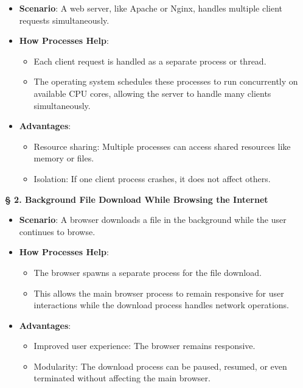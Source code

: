 \documentclass[a4paper]{book}
\newcommand{\sfbf}[1]{{\normalsize\textsf{\textbf{§ #1}}}}
\begin{document}
\begin{itemize}
\item 
\textbf{Scenario}: A web server, like Apache or Nginx, handles multiple client requests simultaneously.

\item 
\textbf{How Processes Help}:
\begin{itemize}
\item 
Each client request is handled as a separate process or thread.

\item 
The operating system schedules these processes to run concurrently on available CPU cores, allowing the server to handle many clients simultaneously.

\end{itemize}

\item 
\textbf{Advantages}:
\begin{itemize}
\item 
Resource sharing: Multiple processes can access shared resources like memory or files.

\item 
Isolation: If one client process crashes, it does not affect others.

\end{itemize}

\end{itemize}

\hrulefill

\sfbf{2. Background File Download While Browsing the Internet}

\begin{itemize}
\item 
\textbf{Scenario}: A browser downloads a file in the background while the user continues to browse.

\item 
\textbf{How Processes Help}:
\begin{itemize}
\item 
The browser spawns a separate process for the file download.

\item 
This allows the main browser process to remain responsive for user interactions while the download process handles network operations.

\end{itemize}

\item 
\textbf{Advantages}:
\begin{itemize}
\item 
Improved user experience: The browser remains responsive.

\item 
Modularity: The download process can be paused, resumed, or even terminated without affecting the main browser.

\end{itemize}

\end{itemize}
\hrulefill
\end{document}
